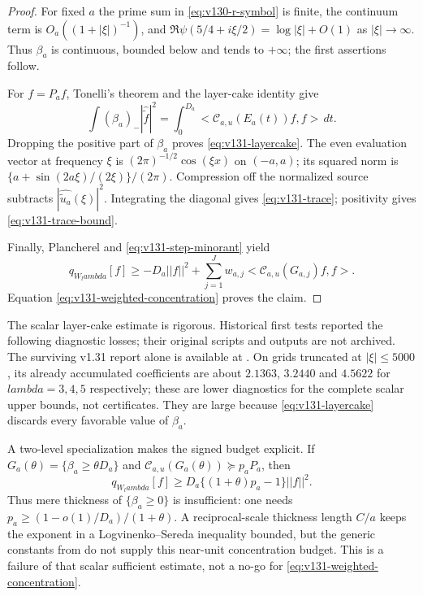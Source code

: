 \documentclass[11pt]{article}
\def\lambda{lambda}%
\def\norm#1{||#1||}%
\def\ip#1#2{<#1,#2>}%
\theoremstyle{remark}
\newcommand{\norm}[1]{\left\lVert #1\right\rVert}
\newcommand{\ip}[2]{\left\langle #1,#2\right\rangle}
\begin{document}
\begin{proof}
For fixed $a$ the prime sum in \eqref{eq:v130-r-symbol} is finite, the
continuum term is $O_a((1+|\xi|)^{-1})$, and
$\Re\psi(5/4+i\xi/2)=\log|\xi|+O(1)$ as $|\xi|\to\infty$.
Thus $\beta_a$ is continuous, bounded below and tends to $+\infty$;
the first assertions follow.

For $f=P_af$, Tonelli's theorem and the layer-cake identity give
\[
 \int(\beta_a)_-|\widehat{\widetilde f}|^2
 =\int_0^{D_a}\ip{\mathcal C_{a,u}(E_a(t))f}f\,dt.
\]
Dropping the positive part of $\beta_a$ proves
\eqref{eq:v131-layercake}.  The even evaluation vector at frequency
$\xi$ is $(2\pi)^{-1/2}\cos(\xi x)$ on $(-a,a)$; its squared norm is
$\{a+\sin(2a\xi)/(2\xi)\}/(2\pi)$.  Compression off the normalized
source subtracts $|\widehat{\widetilde u_a}(\xi)|^2$.  Integrating the
diagonal gives \eqref{eq:v131-trace}; positivity gives
\eqref{eq:v131-trace-bound}.

Finally, Plancherel and \eqref{eq:v131-step-minorant} yield
\[
 q_{W_\lambda}[f]
 \ge -D_a\norm f^2+
       \sum_{j=1}^Jw_{a,j}\ip{\mathcal C_{a,u}(G_{a,j})f}f.
\]
Equation \eqref{eq:v131-weighted-concentration} proves the claim.
\end{proof}

The scalar layer-cake estimate is rigorous. Historical first tests
reported the following diagnostic losses; their original scripts and
outputs are not archived. The surviving v1.31 report alone is available
at .  On grids truncated at $|\xi|\le5000$, its already accumulated
coefficients are about $2.1363$, $3.2440$ and $4.5622$ for
$\lambda=3,4,5$ respectively; these are lower diagnostics for the
complete scalar upper bounds, not certificates.  They are large
because \eqref{eq:v131-layercake} discards every favorable value of
$\beta_a$.

A two-level specialization makes the signed budget explicit.  If
$G_a(\theta)=\{\beta_a\ge\theta D_a\}$ and
$\mathcal C_{a,u}(G_a(\theta))\succeq p_aP_a$, then
\begin{equation}\label{eq:v131-two-level}
 q_{W_\lambda}[f]
 \ge D_a\{(1+\theta)p_a-1\}\norm f^2.
\end{equation}
Thus mere thickness of $\{\beta_a\ge0\}$ is insufficient: one needs
$p_a\ge(1-o(1)/D_a)/(1+\theta)$.  A reciprocal-scale thickness
length $C/a$ keeps the exponent in a Logvinenko--Sereda inequality
bounded, but the generic constants from
\cite{Kovrijkine2000} do not supply this near-unit concentration
budget.  This is a failure of that scalar sufficient estimate, not a
no-go for \eqref{eq:v131-weighted-concentration}.
\end{document}
